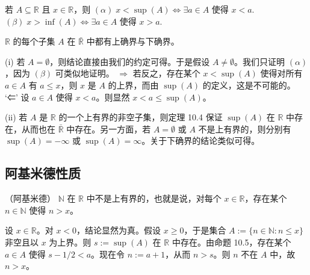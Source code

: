 \begin{proposition}

\begin{subitems}
\item

若 $ A \subseteq \mathbb{R} $ 且 $ x \in \mathbb{R} $，则
$ (\alpha) \; x < \sup(A) \Leftrightarrow \exists a \in A \text{ 使得 } x < a. $
$ (\beta) \; x > \inf(A) \Longleftrightarrow \exists a \in A \text{ 使得 } x > a. $

\item

$ \mathbb{R} $ 的每个子集 $ A $ 在 $ \bar{\mathbb{R}} $ 中都有上确界与下确界。

\proofhead
(i) 若 $ A = \emptyset $，则结论直接由我们的约定可得。于是假设 $ A \neq \emptyset $。我们只证明 $ (\alpha) $，因为 $ (\beta) $ 可类似地证明。
$ \Rightarrow $ 若反之，存在某个 $ x < \sup(A) $ 使得对所有 $ a \in A $ 有 $ a \leq x $，则 $ x $ 是 $ A $ 的上界，而由 $ \sup(A) $ 的定义，这是不可能的。
‘⇐’ 设 $ a \in A $ 使得 $ x < a $。则显然 $ x < a \leq \sup(A) $。
\end{subitems}

(ii) 若 $ A $ 是 $ \mathbb{R} $ 的一个上有界的非空子集，则定理 10.4 保证 $ \operatorname{sup}(A) $ 在 $ \mathbb{R} $ 中存在，从而也在 $ \bar{\mathbb{R}} $ 中存在。另一方面，若 $ A = \emptyset $ 或 $ A $ 不是上有界的，则分别有 $ \operatorname{sup}(A) = -\infty $ 或 $ \operatorname{sup}(A) = \infty $。关于下确界的结论类似可得。

\end{proposition}

\subsection*{阿基米德性质}

\begin{proposition}

（阿基米德） $ \mathbb{N} $ 在 $ \mathbb{R} $ 中不是上有界的，也就是说，对每个 $ x \in \mathbb{R} $，存在某个 $ n \in \mathbb{N} $ 使得 $ n > x $。

\proofhead
设 $ x \in \mathbb{R} $。对 $ x < 0 $，结论显然为真。假设 $ x \geq 0 $，于是集合 $ A := \{n \in \mathbb{N} : n \leq x\} $ 非空且以 $ x $ 为上界。则 $ s := \sup(A) $ 在 $ \mathbb{R} $ 中存在。由命题 10.5，存在某个 $ a \in A $ 使得 $ s - 1/2 < a $。现在令 $ n := a + 1 $，从而 $ n > s $。则 $ n $ 不在 $ A $ 中，故 $ n > x $。
\end{proposition}

